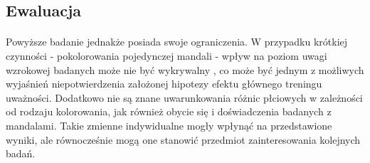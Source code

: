 \documentclass[12pt,a4paper,final,oneside,onecolumn,titlepage]{article}
\begin{document}
\subsection*{\normalsize{\textbf{Ewaluacja}}}
\paragraph{}
Powyższe badanie jednakże posiada swoje ograniczenia. W przypadku krótkiej czynności - pokolorowania pojedynczej mandali - wpływ na poziom uwagi wzrokowej badanych może nie być wykrywalny \citep{thompson_influence_2021}, co może być jednym z możliwych wyjaśnień niepotwierdzenia założonej hipotezy efektu głównego treningu uważności. Dodatkowo nie są znane uwarunkowania różnic płciowych w zależności od rodzaju kolorowania, jak również obycie się i doświadczenia badanych z mandalami. Takie zmienne indywidualne mogły wpłynąć na przedstawione wyniki, ale równocześnie mogą one stanowić przedmiot zainteresowania kolejnych badań.
\newpage

\end{document}
